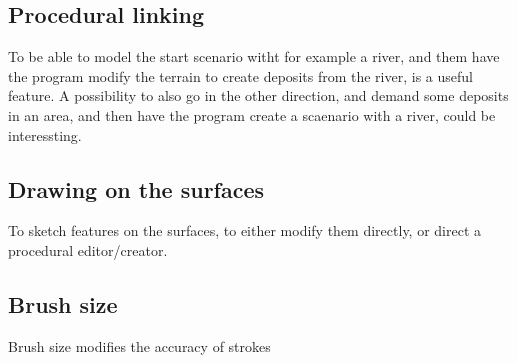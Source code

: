 \documentclass[a4paper,10pt]{article}
\begin{document}
\subsection*{Procedural linking}
To be able to model the start scenario witht for example a river, and them have the program modify the terrain to create deposits from the river, is a useful feature. A possibility to also go in the other direction, and demand some deposits in an area, and then have the program create a scaenario with a river, could be interessting.
\subsection*{Drawing on the surfaces}
To sketch features on the surfaces, to either modify them directly, or direct a procedural editor/creator.
\subsection*{Brush size}
Brush size modifies the accuracy of strokes
\end{document}
